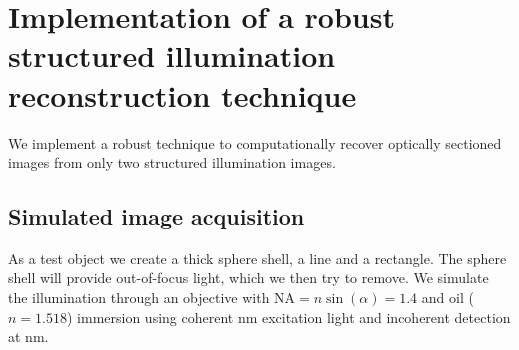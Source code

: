 

\newcommand{\avg}[1]{\langle #1 \rangle}

\chapter{Implementation of a robust structured illumination
  reconstruction technique}
\label{sec:app_hilo}
\begin{summary}
  We implement a robust technique to computationally recover optically
  sectioned images from only two structured illumination images.
\end{summary}
\section{Simulated image acquisition}
As a test object we create a thick sphere shell, a line and a
rectangle. The sphere shell will provide out-of-focus light, which we
then try to remove. We simulate the illumination through an objective
with $\textrm{NA}=n\sin(\alpha)=1.4$ and oil ($n=1.518$) immersion
using coherent \unit[473]{nm} excitation light and incoherent
detection at \unit[520]{nm}.

